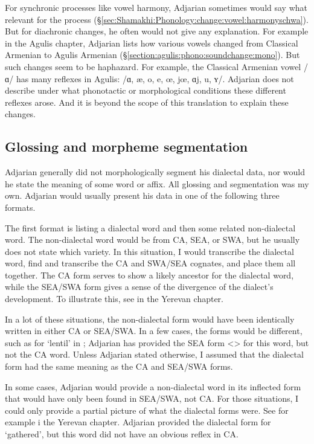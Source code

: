 \documentclass[output=paper]{langscibook}
\begin{document}
For synchronic processes like vowel harmony, Adjarian sometimes would say what   relevant for the process (\S\ref{sec:Shamakhi:Phonology:change:vowel:harmonyschwa}). But for diachronic changes, he often would not give  any explanation. For example in the Agulis chapter, Adjarian lists how various   vowels changed from Classical Armenian to Agulis Armenian (\S\ref{section:agulis:phono:soundchange:mono}). But such changes seem to be haphazard. For example, the  Classical Armenian vowel /ɑ/ has many reflexes in Agulis:  /ɑ, æ, o, e, œ, jœ, ɑj, u, ʏ/. Adjarian does not describe under what phonotactic or morphological conditions these different reflexes arose. And it is beyond the scope of this translation to explain these changes. 
 
\subsection{Glossing and morpheme segmentation}\label{sec:HossepIntro:translation:gloss}

Adjarian generally did not morphologically segment his dialectal data, nor would he state the meaning of some word or affix. All glossing and segmentation was my own. Adjarian would usually present his data in one of the following three formats. 


The first format is listing a dialectal word and then some related non-dialectal word. The non-dialectal word would be from CA, SEA, or SWA, but he usually does not state which variety. In this situation, I would transcribe the dialectal word, find and transcribe the CA and SWA/SEA cognates, and place them all together. The CA form serves to show a likely ancestor for the dialectal word, while the SEA/SWA form gives a sense of the divergence of the dialect's development. To illustrate this,  see  in  the Yerevan chapter.  


In a lot of these situations, the non-dialectal form would have been identically written in either CA or SEA/SWA. In a few cases, the forms would be different, such as for `lentil' in ; Adjarian has provided the SEA form <> for this word, but not the CA word. Unless Adjarian stated otherwise, I assumed that the dialectal form had the same meaning as the CA and SEA/SWA forms. 

In some cases, Adjarian would provide a non-dialectal word in its inflected form that would have only been found in SEA/SWA, not CA. For those situations, I could only provide a partial picture of what the dialectal forms were. See for example   i the Yerevan chapter. Adjarian provided the dialectal form for `gathered', but this word did not have an obvious reflex in CA. 
\end{document}
